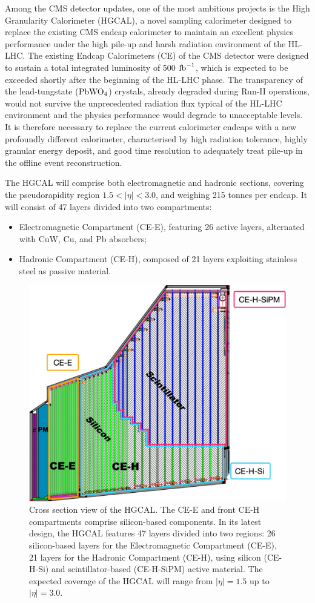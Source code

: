 Among the CMS detector updates, one of the most ambitious projects is the High Granularity Calorimeter (HGCAL), a novel sampling calorimeter designed to replace the existing CMS endcap calorimeter to maintain an excellent physics performance under the high pile-up and harsh radiation environment of the HL-LHC.
The existing Endcap Calorimeters (CE) of the CMS detector were designed to sustain a total integrated luminosity of 500 $\textnormal{fb}^{-1}$, which is expected to be exceeded shortly after the beginning of the HL-LHC phase. 
The transparency of the lead-tungstate ($\textnormal{PbWO}_4$) crystals, already degraded during Run-II operations, would not survive the unprecedented radiation flux typical of the HL-LHC environment and the physics performance would degrade to unacceptable levels.
It is therefore necessary to replace the current calorimeter endcaps with a new profoundly different calorimeter, characterised by high radiation tolerance, highly granular energy deposit, and good time resolution to adequately treat pile-up in the offline event reconstruction.

\bigbreak

The HGCAL will comprise both electromagnetic and hadronic sections, covering the pseudorapidity region $1.5<|\eta|<3.0$, and weighing 215 tonnes per endcap. It will consist of 47 layers divided into two compartments:
\begin{itemize}
    \item Electromagnetic Compartment (CE-E), featuring 26 active layers, alternated with CuW, Cu, and Pb absorbers;
    \item Hadronic Compartment (CE-H), composed of 21 layers exploiting stainless steel as passive material.
\end{itemize}

\begin{figure}
    \centering
    \includegraphics[width=0.6\linewidth]{Figures/HGCAL/HGCALLayers.pdf}
    \caption{Cross section view of the HGCAL. The CE-E and front CE-H compartments comprise silicon-based components. In its latest design, the HGCAL features 47 layers divided into two regions: 26 silicon-based layers for the Electromagnetic Compartment (CE-E), 21 layers for the Hadronic Compartment (CE-H), using silicon (CE-H-Si) and scintillator-based (CE-H-SiPM) active material. The expected coverage of the HGCAL will range from $|\eta|=1.5$ up to $|\eta|=3.0$.}
    \label{fig:HGCALLayers}
\end{figure}

